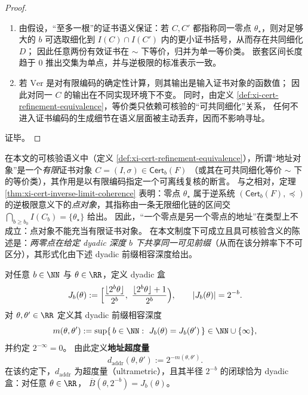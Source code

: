 \begin{proof}
\begin{enumerate}
  \item
  由假设，“至多一根”的证书语义保证：若 \(C,C'\) 都指称同一零点 \(\theta_\star\)，则对足够大的 \(b\) 可选取细化到 \(I(C)\cap I(C')\) 内的更小证书括号，从而存在共同细化 \(D\)；
  因此任意两份有效证书在 \(\sim\) 下等价，归并为单一等价类。
  嵌套区间长度趋于 \(0\) 推出交集为单点，并与逆极限的标准表示一致。
  \item
  若 \(\mathrm{Ver}\) 是对有限编码的确定性计算，则其输出是输入证书对象的函数值；
  因此对同一 \(C\) 的输出在不同实现环境下不变。
  同时，由定义 \ref{def:xi-cert-refinement-equivalence}，等价类只依赖可核验的“可共同细化”关系，
  任何不进入证书编码的生成细节在语义层面被主动丢弃，因而不影响寻址。
\end{enumerate}
证毕。
\end{proof}

\begin{corollary}\label{cor:xi-zero-not-address}
在本文的可核验语义中（定义 \ref{def:xi-cert-refinement-equivalence}），所谓“地址对象”是一个\emph{有限}证书对象
\(
C=(I,\sigma)\in\mathsf{Cert}_b(F)
\)
（或其在可共同细化等价 \(\sim\) 下的等价类），其作用是以有限编码指定一个可离线复核的断言。
与之相对，定理 \ref{thm:xi-cert-inverse-limit-coherence} 表明：零点 \(\theta_\star\) 属于逆系统 \((\mathsf{Cert}_b(F),\preceq)\) 的逆极限意义下的\emph{点对象}，其指称由一条无限细化链的区间交
\(
\bigcap_{b\ge b_0} I(C_b)=\{\theta_\star\}
\)
给出。
因此，“一个零点是另一个零点的地址”在类型上不成立：点对象不能充当有限证书对象。
在本文制度下可成立且具可核验含义的陈述是：\emph{两零点在给定 dyadic 深度 \(b\) 下共享同一可见前缀}（从而在该分辨率下不可区分），其形式化由下述 dyadic 前缀相容深度给出。
\end{corollary}

\begin{definition}\label{def:xi-dyadic-prefix-depth-ultrametric}
对任意 \(b\in\NN\) 与 \(\theta\in\RR\)，定义 dyadic 盒
\[
J_b(\theta):=\Bigl[\frac{\lfloor 2^b\theta\rfloor}{2^b},\ \frac{\lfloor 2^b\theta\rfloor+1}{2^b}\Bigr),
\qquad |J_b(\theta)|=2^{-b}.
\]
对 \(\theta,\theta'\in\RR\) 定义其 dyadic 前缀相容深度
\[
m(\theta,\theta'):=\sup\{\,b\in\NN:\ J_b(\theta)=J_b(\theta')\,\}\in\NN\cup\{\infty\},
\]
并约定 \(2^{-\infty}=0\)。
由此定义\textbf{地址超度量}
\[
d_{\mathrm{addr}}(\theta,\theta'):=2^{-m(\theta,\theta')}.
\]
在该约定下，\(d_{\mathrm{addr}}\) 为超度量（ultrametric），且其半径 \(2^{-b}\) 的闭球恰为 dyadic 盒：对任意 \(\theta\in\RR\)，
\(
\overline{B}(\theta,2^{-b})=J_b(\theta)
\)。
\end{definition}

